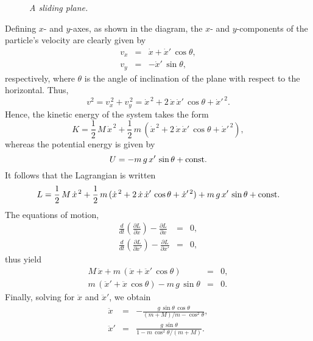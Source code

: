 \begin{figure}
\epsfysize=1.75in
\centerline{}
\caption{\em A sliding plane.}\label{plane}
\end{figure}

Defining $x$- and $y$-axes, as shown in the diagram, the $x$- and 
$y$-components of the particle's velocity are clearly given by
\begin{eqnarray}
v_x &=& \dot{x} + \dot{x}'\,\cos\theta,\\[0.5ex]
v_y&=& -\dot{x}'\,\sin\theta,
\end{eqnarray}
respectively, where $\theta$ is the angle of inclination of the plane with
respect to the horizontal.
Thus,
\begin{equation}
v^2 = v_x^{\,2} + v_y^{\,2} = \dot{x}^{\,2} + 2\,\dot{x}\,\dot{x}'\,\cos\theta+ \dot{x}'^{\,2}.
\end{equation}
Hence, the kinetic energy of the system takes the form
\begin{equation}
K = \frac{1}{2}\,M\,\dot{x}^{\,2} + \frac{1}{2}\,m\,(\dot{x}^{\,2} + 2\,\dot{x}\,\dot{x}'\,\cos\theta+ \dot{x}'^{\,2}),
\end{equation}
whereas the potential energy is given by
\begin{equation}
U = - m\,g\,x'\,\sin\theta + {\rm const}.
\end{equation}
It follows that the Lagrangian is written
\begin{equation}\label{e10.51}
L = \frac{1}{2}\,M\,\dot{x}^{\,2} + \frac{1}{2}\,m\,(\dot{x}^{\,2} + 2\,\dot{x}\,\dot{x}'\,\cos\theta+ \dot{x}'^{\,2})+  m\,g\,x'\,\sin\theta + {\rm const}.
\end{equation}
The equations of motion,
\begin{eqnarray}
\frac{d}{dt}\!\left(\frac{\partial L}{\partial\dot{x}}\right) - \frac{\partial L}{\partial x} &=& 0,\\[0.5ex]
\frac{d}{dt}\!\left(\frac{\partial L}{\partial\dot{x}'}\right) - \frac{\partial L}{\partial x'} &=& 0,
\end{eqnarray}
thus yield
\begin{eqnarray}
M\,\ddot{x}+ m\,(\ddot{x} + \ddot{x}'\,\cos\theta) &=& 0,\\[0.5ex]
m\,(\ddot{x}'+ \ddot{x}\,\cos\theta) - m\,g\,\sin\theta &=& 0.
\end{eqnarray}
Finally, solving for $\ddot{x}$ and $\ddot{x}'$, we obtain
\begin{eqnarray}
\ddot{x} &=&  - \frac{g\,\sin\theta\,\cos\theta}{(m+M)/m-\cos^2\theta},\\[0.5ex]
\ddot{x}' &=& \frac{g\,\sin\theta}{1 - m\,\cos^2\theta/(m+M)}.
\end{eqnarray}

